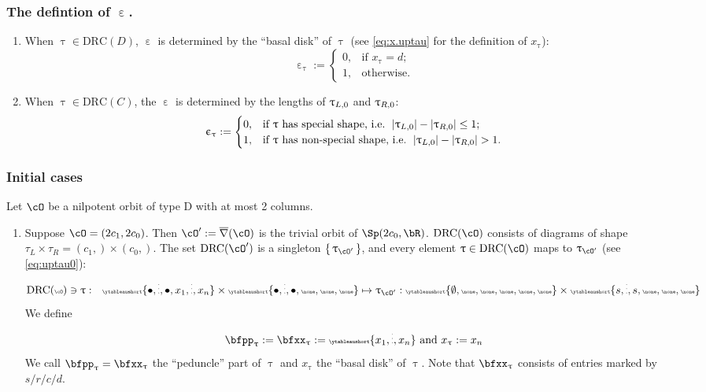 \documentclass[12pt,a4paper]{amsart}
\def\abs#1{\left|{#1}\right|}
\def\eDD{\overline{\nabla}}
\numberwithin{equation}{section}
\theoremstyle{remark}
\def\drc{\mathrm{DRC}}
\let\ytb=\ytableaushort
\newcommand{\tytb}[1]{{\tiny\ytb{#1}}}
\def\cOp{\cO^{\prime}}
\def\uptaup{\uptau^{\prime}}
\begin{document}
\subsubsection{The defintion of $\upepsilon$.} \label{sec:upepsilon}
\begin{enumerate}[label=(\arabic*).,series=alg1]
  \item When $\uptau\in \drc(D)$, $\upepsilon$ is determined by the ``basal
  disk'' of $\uptau$ (see \eqref{eq:x.uptau} for the definition of $x_{\uptau}$):%
  \[
    \upepsilon_{\uptau}:=
    \begin{cases}
      0, & \text{if $x_{\uptau}=d$;} \\
      1, & \text{otherwise.}
    \end{cases}
  \]
  \item When $\uptau\in \drc(C)$, the  $\upepsilon$  is determined by
  the lengths of $\uptau_{L,0}$ and $\uptau_{R,0}$:
  \[
    \upepsilon_{\uptau} :=
    \begin{cases}
      0, & \text{if $\uptau$ has special shape, i.e. } \abs{\taulf}-\abs{\taurf} \leq  1;\\
      1, & \text{if $\uptau$ has non-special shape, i.e. }\abs{\taulf} - \abs{\taurf}> 1.
    \end{cases}
  \]
\end{enumerate}

\medskip


\subsubsection{Initial cases}
Let $\cO$ be a nilpotent orbit of type D with at most 2 columns.
\begin{enumerate}[resume*=alg1]
  \item Suppose $\cO = (2c_{1},2c_{0})$.
        Then
        $\cOp:=\eDD(\cO)$ is the trivial orbit of $\Sp(2c_{0},\bR)$. $\drc(\cO)$
        consists of diagrams of shape
        $\tau_{L}\times \tau_{R} =(c_{1},)\times (c_{0},)$.
        The set $\drc(\cOp)$ is a singleton $\set{\uptau_{\cOp}}$, and every element
        $\uptau \in \drc(\cO)$ maps to $\uptau_{\cOp}$ (see \eqref{eq:uptau0}):
        \[\tiny
          \drc(\cO)\ni \uptau: \hspace{1em} \ytb{\bullet,\vdots,\bullet,{x_{1}},\vdots,{x_{n}}}
          \times \ytb{\bullet,\vdots,\bullet,\none,\none,\none}
          \mapsto \uptau_{\cOp}:
          \ytb{\emptyset,\none,\none,\none,\none,\none}
          \times \ytb{s,\vdots,s,\none,\none,\none}
        \]
        We define
        \[
          \bfpp_{\uptau}:=\bfxx_{\uptau} := \tytb{{x_{1}},\vdots,{x_{n}}} \text{ and }x_{\uptau}:=x_{n}
        \]
        We call $\bfpp_{\uptau}=\bfxx_{\uptau}$ the ``peduncle'' part of $\uptau$ and
        $x_{\uptau}$ the
        ``basal disk'' of $\uptau$.
        Note that $\bfxx_{\uptau}$ consists of entries marked by $s/r/c/d$.
\end{enumerate}
\end{document}
